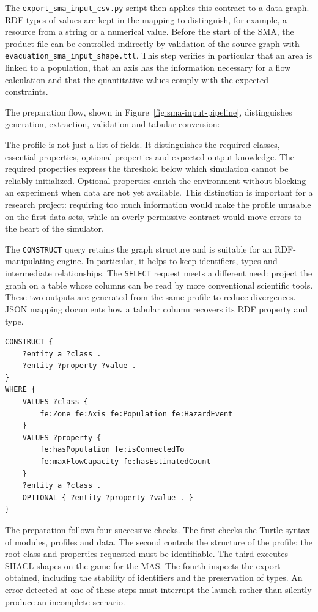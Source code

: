 \documentclass{article}
\begin{document}
The \texttt{export\_sma\_input\_csv.py} script then applies this contract to a data graph. RDF types of values are kept in the mapping to distinguish, for example, a resource from a string or a numerical value. Before the start of the SMA, the product file can be controlled indirectly by validation of the source graph with \texttt{evacuation\_sma\_input\_shape.ttl}. This step verifies in particular that an area is linked to a population, that an axis has the information necessary for a flow calculation and that the quantitative values comply with the expected constraints.

The preparation flow, shown in Figure~\ref{fig:sma-input-pipeline}, distinguishes generation, extraction, validation and tabular conversion:

The profile is not just a list of fields. It distinguishes the required classes, essential properties, optional properties and expected output knowledge. The required properties express the threshold below which simulation cannot be reliably initialized. Optional properties enrich the environment without blocking an experiment when data are not yet available. This distinction is important for a research project: requiring too much information would make the profile unusable on the first data sets, while an overly permissive contract would move errors to the heart of the simulator.

The \texttt{CONSTRUCT} query retains the graph structure and is suitable for an RDF-manipulating engine. In particular, it helps to keep identifiers, types and intermediate relationships. The \texttt{SELECT} request meets a different need: project the graph on a table whose columns can be read by more conventional scientific tools. These two outputs are generated from the same profile to reduce divergences. JSON mapping documents how a tabular column recovers its RDF property and type.

\begin{lstlisting}[language=SPARQL,caption={Simplified structure of the extraction request generated}]
CONSTRUCT {
    ?entity a ?class .
    ?entity ?property ?value .
}
WHERE {
    VALUES ?class {
        fe:Zone fe:Axis fe:Population fe:HazardEvent
    }
    VALUES ?property {
        fe:hasPopulation fe:isConnectedTo
        fe:maxFlowCapacity fe:hasEstimatedCount
    }
    ?entity a ?class .
    OPTIONAL { ?entity ?property ?value . }
}
\end{lstlisting}

The preparation follows four successive checks. The first checks the Turtle syntax of modules, profiles and data. The second controls the structure of the profile: the root class and properties requested must be identifiable. The third executes SHACL shapes on the game for the MAS. The fourth inspects the export obtained, including the stability of identifiers and the preservation of types. An error detected at one of these steps must interrupt the launch rather than silently produce an incomplete scenario.
\end{document}
